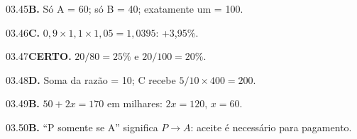\begin{solucao}{03.45}\textbf{B.} Só A = 60; só B = 40; exatamente um = 100.\end{solucao}
\begin{solucao}{03.46}\textbf{C.} $0,9\times1,1\times1,05=1,0395$: +3,95\%.\end{solucao}
\begin{solucao}{03.47}\textbf{CERTO.} $20/80=25\%$ e $20/100=20\%$.\end{solucao}
\begin{solucao}{03.48}\textbf{D.} Soma da razão = 10; C recebe $5/10\times400=200$.\end{solucao}
\begin{solucao}{03.49}\textbf{B.} $50+2x=170$ em milhares: $2x=120$, $x=60$.\end{solucao}
\begin{solucao}{03.50}\textbf{B.} ``P somente se A'' significa $P\to A$: aceite é necessário para pagamento.\end{solucao}
